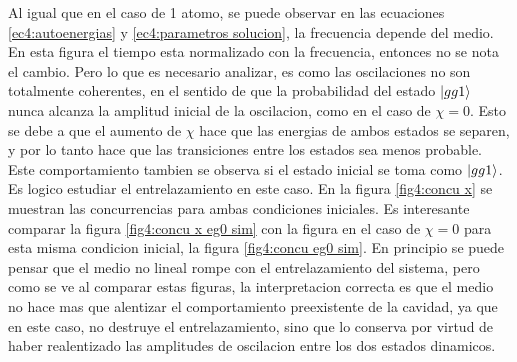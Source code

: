 Al igual que en el caso de 1 atomo, se puede observar en las ecuaciones \ref{ec4:autoenergias} y \ref{ec4:parametros solucion}, la frecuencia depende del medio. En esta figura el tiempo esta normalizado con la frecuencia, entonces no se nota el cambio. Pero lo que es necesario analizar, es como las oscilaciones no son totalmente coherentes, en el sentido de que la probabilidad del estado $\ket{gg1}$ nunca alcanza la amplitud inicial de la oscilacion, como en el caso de $\chi=0$. Esto se debe a que el aumento de $\chi$ hace que las energias de ambos estados se separen, y por lo tanto hace que las transiciones entre los estados sea menos probable. Este comportamiento tambien se observa si el estado inicial se toma como $\ket{gg1}$. Es logico estudiar el entrelazamiento en este caso. En la figura \ref{fig4:concu x} se muestran las concurrencias para ambas condiciones iniciales. Es interesante comparar la figura \ref{fig4:concu x eg0 sim} con la figura en el caso de $\chi=0$ para esta misma condicion inicial, la figura \ref{fig4:concu eg0 sim}. En principio se puede pensar que el medio no lineal rompe con el entrelazamiento del sistema, pero como se ve al comparar estas figuras, la interpretacion correcta es que el medio no hace mas que alentizar el comportamiento preexistente de la cavidad, ya que en este caso, no destruye el entrelazamiento, sino que lo conserva por virtud de haber realentizado las amplitudes de oscilacion entre los dos estados dinamicos.
